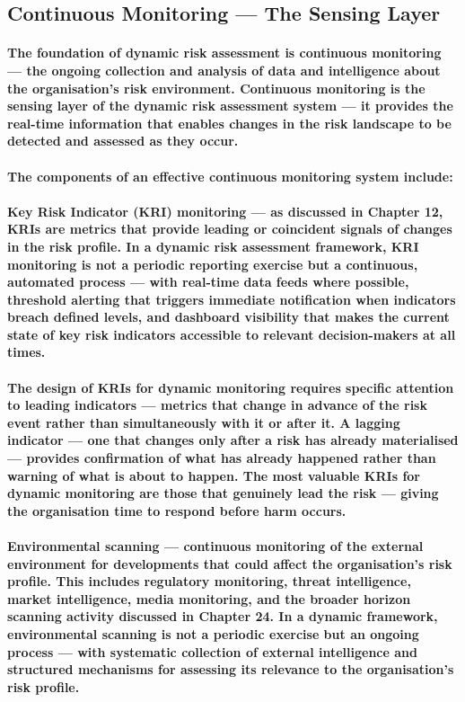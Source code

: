 \subsection{Continuous Monitoring — The Sensing Layer}
\paragraph{The foundation of dynamic risk assessment is continuous monitoring — the ongoing collection and analysis of data and intelligence about the organisation's risk environment. Continuous monitoring is the sensing layer of the dynamic risk assessment system — it provides the real-time information that enables changes in the risk landscape to be detected and assessed as they occur.}
\paragraph{The components of an effective continuous monitoring system include:}
\paragraph{\textbf{Key Risk Indicator (KRI) monitoring} — as discussed in Chapter 12, KRIs are metrics that provide leading or coincident signals of changes in the risk profile. In a dynamic risk assessment framework, KRI monitoring is not a periodic reporting exercise but a continuous, automated process — with real-time data feeds where possible, threshold alerting that triggers immediate notification when indicators breach defined levels, and dashboard visibility that makes the current state of key risk indicators accessible to relevant decision-makers at all times.}
\paragraph{The design of KRIs for dynamic monitoring requires specific attention to \textbf{leading indicators} — metrics that change in advance of the risk event rather than simultaneously with it or after it. A lagging indicator — one that changes only after a risk has already materialised — provides confirmation of what has already happened rather than warning of what is about to happen. The most valuable KRIs for dynamic monitoring are those that genuinely lead the risk — giving the organisation time to respond before harm occurs.}
\paragraph{\textbf{Environmental scanning} — continuous monitoring of the external environment for developments that could affect the organisation's risk profile. This includes regulatory monitoring, threat intelligence, market intelligence, media monitoring, and the broader horizon scanning activity discussed in Chapter 24. In a dynamic framework, environmental scanning is not a periodic exercise but an ongoing process — with systematic collection of external intelligence and structured mechanisms for assessing its relevance to the organisation's risk profile.}
